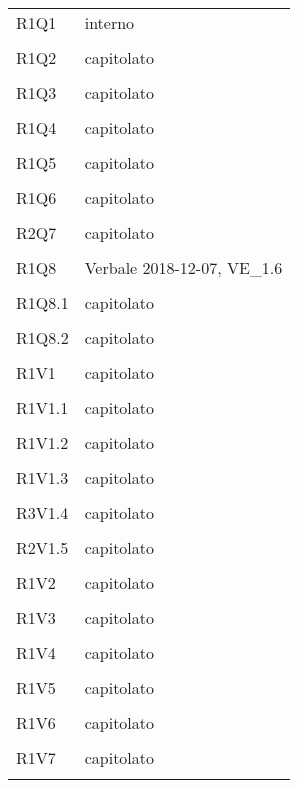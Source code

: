 \begin{longtable}{ >{\centering}p{}
		>{\centering}p{}}
	R1Q1 & interno\\\tabularnewline
	
	R1Q2 & capitolato\\\tabularnewline
	
	R1Q3 & capitolato\\\tabularnewline
	
	R1Q4 & capitolato\\\tabularnewline
	
	R1Q5 & capitolato\\\tabularnewline
	
	R1Q6 & capitolato\\\tabularnewline
	
	R2Q7 & capitolato\\\tabularnewline
	
	R1Q8 & Verbale 2018-12-07, VE\_1.6\\\tabularnewline
	
	R1Q8.1 & capitolato\\\tabularnewline
	
	R1Q8.2 & capitolato\\\tabularnewline
	
	R1V1 & capitolato\\\tabularnewline
	
	R1V1.1 & capitolato\\\tabularnewline
	
	R1V1.2 & capitolato\\\tabularnewline
	
	R1V1.3 & capitolato\\\tabularnewline
	
	R3V1.4 & capitolato\\\tabularnewline
	
	R2V1.5 & capitolato\\\tabularnewline
	
	R1V2 & capitolato\\\tabularnewline
	
	R1V3 & capitolato\\\tabularnewline
	
	R1V4 & capitolato\\\tabularnewline
	
	R1V5 & capitolato\\\tabularnewline
	
	R1V6 & capitolato\\\tabularnewline
	
	R1V7 & capitolato\\\tabularnewline
	

\end{longtable}
